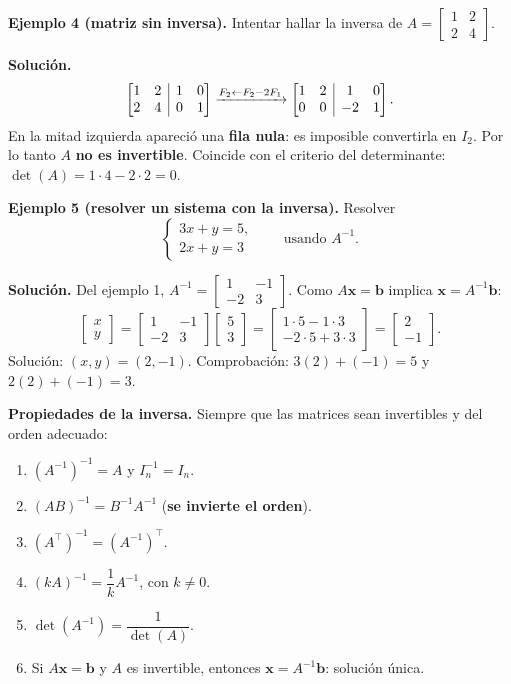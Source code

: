 \documentclass[12pt, letterpaper]{article}
\makeatletter
\newcommand{\mwmat}[1]{\ensuremath{\begin{bmatrix}#1\end{bmatrix}}}
\newcommand{\mwaug}[2]{\ensuremath{\left[\begin{array}{@{}#1@{}}#2\end{array}\right]}}
\makeatother
\begin{document}
\begin{cuadrosolucion}
  \small
  \textbf{Ejemplo 4 (matriz sin inversa).} Intentar hallar la inversa de
  $A=\mwmat{1&2\\2&4}$.

  \medskip
  \textbf{Solución.}
  \[
    \mwaug{cc|cc}{1&2&1&0\\2&4&0&1}
    \xrightarrow{F_2\leftarrow F_2-2F_1}
    \mwaug{cc|cc}{1&2&1&0\\0&0&-2&1}.
  \]
  En la mitad izquierda apareció una \textbf{fila nula}: es imposible
  convertirla en $I_2$. Por lo tanto $A$ \textbf{no es invertible}. Coincide
  con el criterio del determinante: $\det(A)=1\cdot4-2\cdot2=0$.
\end{cuadrosolucion}

\begin{cuadrosolucion}
  \small
  \textbf{Ejemplo 5 (resolver un sistema con la inversa).} Resolver
  \[
    \begin{cases}
      3x+y=5,\\
      2x+y=3
    \end{cases}
    \qquad\text{usando }A^{-1}.
  \]

  \medskip
  \textbf{Solución.} Del ejemplo 1, $A^{-1}=\mwmat{1&-1\\-2&3}$. Como
  $A\mathbf{x}=\mathbf{b}$ implica $\mathbf{x}=A^{-1}\mathbf{b}$:
  \[
    \mwmat{x\\y}=\mwmat{1&-1\\-2&3}\mwmat{5\\3}
    =\mwmat{1\cdot5-1\cdot3\\-2\cdot5+3\cdot3}
    =\mwmat{2\\-1}.
  \]
  Solución: $(x,y)=(2,-1)$. Comprobación: $3(2)+(-1)=5$ y $2(2)+(-1)=3$.
  \checkmark
\end{cuadrosolucion}

\begin{cuadroteoria}
  \small
  \textbf{Propiedades de la inversa.} Siempre que las matrices sean
  invertibles y del orden adecuado:
  \begin{enumerate}[leftmargin=1.4em, nosep]
    \item $(A^{-1})^{-1}=A$ \quad y \quad $I_n^{-1}=I_n$.
    \item $(AB)^{-1}=B^{-1}A^{-1}$ \quad (\textbf{se invierte el orden}).
    \item $(A^{\top})^{-1}=(A^{-1})^{\top}$.
    \item $(kA)^{-1}=\dfrac{1}{k}A^{-1}$, con $k\neq0$.
    \item $\det(A^{-1})=\dfrac{1}{\det(A)}$.
    \item Si $A\mathbf{x}=\mathbf{b}$ y $A$ es invertible, entonces
          $\mathbf{x}=A^{-1}\mathbf{b}$: solución única.
  \end{enumerate}
\end{cuadroteoria}
\end{document}
